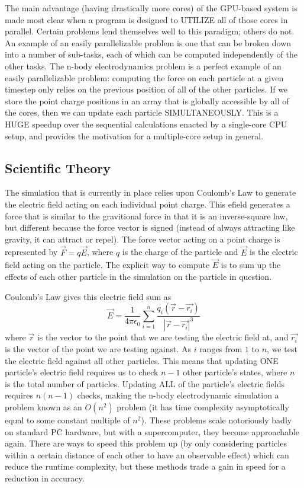 \documentclass[10pt]{article}
\begin{document}
The main advantage (having drastically more cores) of the GPU-based system is made most clear when a program is designed to UTILIZE all of those cores in parallel. Certain problems lend themselves well to this paradigm; others do not. An example of an easily parallelizable problem is one that can be broken down into a number of sub-tasks, each of which can be computed independently of the other tasks. The n-body electrodynamics problem is a perfect example of an easily parallelizable problem: computing the force on each particle at a given timestep only relies on the previous position of all of the other particles. If we store the point charge positions in an array that is globally accessible by all of the cores, then we can update each particle SIMULTANEOUSLY. This is a HUGE speedup over the sequential calculations enacted by a single-core CPU setup, and provides the motivation for a multiple-core setup in general.

\clearpage
\subsection{Scientific Theory}
The simulation that is currently in place relies upon Coulomb's Law to generate the electric field acting on each individual point charge. This efield generates a force that is similar to the gravitional force in that it is an inverse-square law, but different because the force vector is signed (instead of always attracting like gravity, it can attract or repel). The force vector acting on a point charge is represented by $\vec{F} = q\vec{E}$, where $q$ is the charge of the particle and $\vec{E}$ is the electric field acting on the particle. The explicit way to compute $\vec{E}$ is to sum up the effects of each other particle in the simulation on the particle in question.

Coulomb's Law gives this electric field sum as $$\vec{E} = \frac{1}{4\pi\epsilon_0}\sum_{i = 1}^n \frac{q_i (\vec{r} - \vec{r_i})}{|\vec{r} - \vec{r_i}|^3}$$ where $\vec{r}$ is the vector to the point that we are testing the electric field at, and $\vec{r_i}$ is the vector of the point we are testing against. As $i$ ranges from $1$ to $n$, we test the electric field against all other particles. This means that updating ONE particle's electric field requires us to check $n-1$ other particle's states, where $n$ is the total number of particles. Updating ALL of the particle's electric fields requires $n(n-1)$ checks, making the n-body electrodynamic simulation a problem known as an $O(n^2)$ problem (it has time complexity asymptotically equal to some constant multiple of $n^2$). These problems scale notoriously badly on standard PC hardware, but with a supercomputer, they become approachable again. There are ways to speed this problem up (by only considering particles within a certain distance of each other to have an observable effect) which can reduce the runtime complexity, but these methods trade a gain in speed for a reduction in accuracy.
\end{document}

